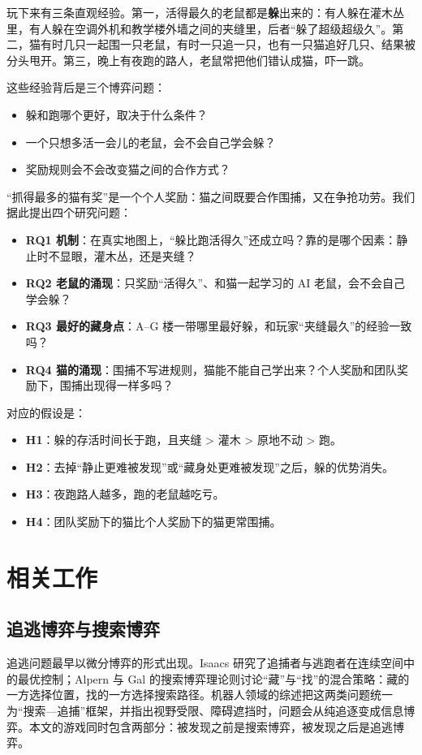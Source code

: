 \documentclass[a4paper,zihao=5,fontset=fandol,UTF8]{ctexart}
\begin{document}
玩下来有三条直观经验。第一，活得最久的老鼠都是\textbf{躲}出来的：有人躲在灌木丛里，有人躲在空调外机和教学楼外墙之间的夹缝里，后者“躲了超级超级久”。第二，猫有时几只一起围一只老鼠，有时一只追一只，也有一只猫追好几只、结果被分头甩开。第三，晚上有夜跑的路人，老鼠常把他们错认成猫，吓一跳。

这些经验背后是三个博弈问题：
\begin{itemize}
  \item 躲和跑哪个更好，取决于什么条件？
  \item 一个只想多活一会儿的老鼠，会不会自己学会躲？
  \item 奖励规则会不会改变猫之间的合作方式？
\end{itemize}
“抓得最多的猫有奖”是一个个人奖励：猫之间既要合作围捕，又在争抢功劳。我们据此提出四个研究问题：
\begin{itemize}
  \item \textbf{RQ1 机制}：在真实地图上，“躲比跑活得久”还成立吗？靠的是哪个因素：静止时不显眼，灌木丛，还是夹缝？
  \item \textbf{RQ2 老鼠的涌现}：只奖励“活得久”、和猫一起学习的 AI 老鼠，会不会自己学会躲？
  \item \textbf{RQ3 最好的藏身点}：A–G 楼一带哪里最好躲，和玩家“夹缝最久”的经验一致吗？
  \item \textbf{RQ4 猫的涌现}：围捕不写进规则，猫能不能自己学出来？个人奖励和团队奖励下，围捕出现得一样多吗？
\end{itemize}

对应的假设是：
\begin{itemize}
  \item \textbf{H1}：躲的存活时间长于跑，且夹缝 > 灌木 > 原地不动 > 跑。
  \item \textbf{H2}：去掉“静止更难被发现”或“藏身处更难被发现”之后，躲的优势消失。
  \item \textbf{H3}：夜跑路人越多，跑的老鼠越吃亏。
  \item \textbf{H4}：团队奖励下的猫比个人奖励下的猫更常围捕。
\end{itemize}

\section{相关工作}
\subsection{追逃博弈与搜索博弈}
追逃问题最早以微分博弈的形式出现。Isaacs 研究了追捕者与逃跑者在连续空间中的最优控制\cite{isaacs1965}；Alpern 与 Gal 的搜索博弈理论则讨论“藏”与“找”的混合策略：藏的一方选择位置，找的一方选择搜索路径\cite{alpern2003}。机器人领域的综述把这两类问题统一为“搜索—追捕”框架，并指出视野受限、障碍遮挡时，问题会从纯追逐变成信息博弈\cite{chung2011}。本文的游戏同时包含两部分：被发现之前是搜索博弈，被发现之后是追逃博弈。
\end{document}
